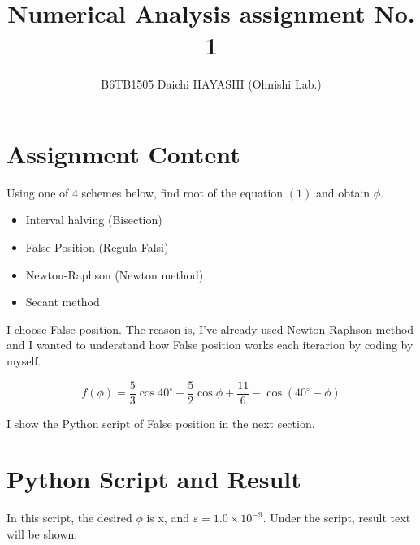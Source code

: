 \documentclass[11pt]{article}
\title{Numerical Analysis assignment No. 1}
\author{B6TB1505 Daichi HAYASHI (Ohnishi Lab.)}
\begin{document}
    
    \maketitle
    \section{Assignment Content}\label{content}

Using one of 4 schemes below, find root of the equation $ (1) $ and
obtain \(\phi\).

\begin{itemize}\item Interval halving (Bisection) \item False Position (Regula
Falsi) \item Newton-Raphson (Newton method) \item Secant method
\end{itemize}
I choose False position. The reason is, I've already used Newton-Raphson method and I
wanted to understand how False position works each iterarion by coding
by myself.

\begin{equation}
  f(\phi) = \dfrac53\cos 40^\circ - \dfrac52\cos \phi + \dfrac{11}6 - \cos\left(40^\circ - \phi \right)
\end{equation}

I show the Python script of False position in the next section.
\section{Python Script and Result}
In this script, the desired \(\phi\) is x, and \(\varepsilon = 1.0\times10^{-9}\). Under the script,
result text will be shown.
\end{document}
